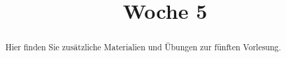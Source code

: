 \documentclass{ximera}
\title{Woche 5}
\begin{document}
\begin{abstract}
Hier finden Sie zusätzliche Materialien und Übungen zur fünften Vorlesung.
\end{abstract}
\maketitle
\end{document}
